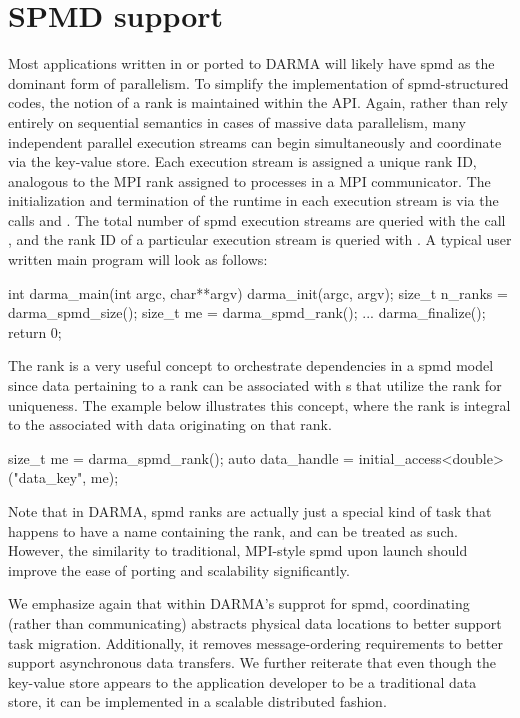 
\section{SPMD support}
\label{sec:spmd}
Most applications written in or ported to \gls{DARMA} will likely have \gls{spmd} as
the dominant form of parallelism.
To simplify the implementation of \gls{spmd}-structured codes, the notion of 
a \gls{rank} is maintained within the \gls{API}.   
Again, rather than rely entirely on \gls{sequential semantics} in cases of massive data parallelism,
many independent parallel \glspl{execution stream} can begin simultaneously and
coordinate via the \gls{key-value store}.
Each \gls{execution stream} is assigned a unique \gls{rank} ID, analogous to the MPI rank assigned to processes in a MPI communicator.
The initialization and termination of the runtime in each \gls{execution stream} is via the calls  
and . 
The total number of \gls{spmd} \glspl{execution stream} are queried with the call ,
and the \gls{rank} ID of a particular \gls{execution stream} is queried with
    . A typical user written main program will look as follows:
\begin{CppCode}
int darma_main(int argc, char**argv){
  darma_init(argc, argv);
  size_t n_ranks = darma_spmd_size();
  size_t me = darma_spmd_rank();
  ...
  darma_finalize();
  return 0;
}
\end{CppCode}

The \gls{rank} is a very useful concept to orchestrate dependencies in a \gls{spmd}
model since data pertaining to a \gls{rank} can be associated with s that utilize
the \gls{rank} for uniqueness. The example below illustrates this concept, where
the \gls{rank} is integral to the  associated with data
originating on that \gls{rank}.
\begin{CppCode}
size_t me = darma_spmd_rank();
auto data_handle = initial_access<double>("data_key", me);
\end{CppCode}  
Note that in \gls{DARMA}, \gls{spmd} \glspl{rank} are actually just a special
kind of \gls{task} that happens to have a name containing the \gls{rank}, and can be treated as such. 
However, the similarity to traditional, MPI-style \gls{spmd} upon launch should improve the ease of porting and scalability significantly.

We emphasize again that within \gls{DARMA}'s supprot for \gls{spmd}, 
coordinating (rather than communicating) abstracts physical data locations to better support task migration.
Additionally, it removes message-ordering requirements to better support asynchronous data transfers.
We further reiterate that even though the \gls{key-value store} appears to the
application developer to be a traditional data store, it can be implemented in a scalable distributed fashion.

